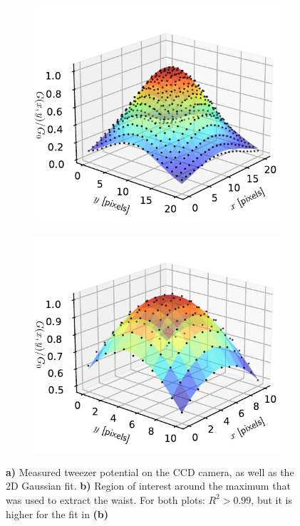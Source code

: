 \begin{figure}
\centering
	\begin{subfigure}{.49\textwidth}
	    \centering
		\includegraphics[width=0.96\linewidth]{figures/3DSpotFitGaussian.pdf}
		\caption{}
		\label{fig:3Dshowing}
	\end{subfigure}
	\begin{subfigure}{.49\textwidth}
		\centering
		\includegraphics[width=0.96\linewidth]{figures/3DSpotFitGaussianSmaller.pdf}
		\caption{}
		\label{fig:3Dwaistfit}
	\end{subfigure}
	\caption{\textsf{\textbf{a)}} Measured tweezer potential on the CCD camera, as well as the 2D Gaussian fit.
	\textsf{\textbf{b)}} Region of interest around the maximum that was used to extract the waist. For both plots: $R^2>0.99$, but it is higher for the fit in \textsf{\textbf{(b)}}}
	\label{fig:3Dfits}
\end{figure}


